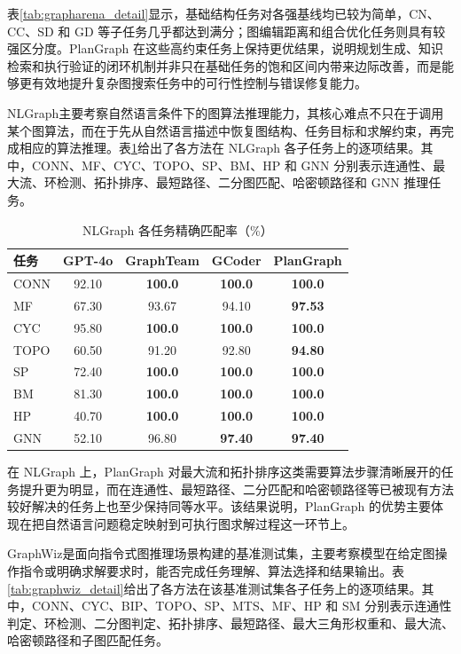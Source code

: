 表\ref{tab:grapharena_detail}显示，基础结构任务对各强基线均已较为简单，CN、CC、SD 和 GD 等子任务几乎都达到满分；图编辑距离和组合优化任务则具有较强区分度。PlanGraph 在这些高约束任务上保持更优结果，说明规划生成、知识检索和执行验证的闭环机制并非只在基础任务的饱和区间内带来边际改善，而是能够更有效地提升复杂图搜索任务中的可行性控制与错误修复能力。

NLGraph\cite{chen2024nlgraph}主要考察自然语言条件下的图算法推理能力，其核心难点不只在于调用某个图算法，而在于先从自然语言描述中恢复图结构、任务目标和求解约束，再完成相应的算法推理。表\ref{tab:nlgraph_detail}给出了各方法在 NLGraph 各子任务上的逐项结果。其中，CONN、MF、CYC、TOPO、SP、BM、HP 和 GNN 分别表示连通性、最大流、环检测、拓扑排序、最短路径、二分图匹配、哈密顿路径和 GNN 推理任务。

\begin{table}[htbp]
\centering
\caption{NLGraph 各任务精确匹配率（\%）}
\label{tab:nlgraph_detail}
\begin{tabular}{lcccc}
\toprule
任务 & GPT-4o & GraphTeam & GCoder & PlanGraph \\
\midrule
CONN & 92.10 & \textbf{100.0} & \textbf{100.0} & \textbf{100.0} \\
MF & 67.30 & 93.67 & 94.10 & \textbf{97.53} \\
CYC & 95.80 & \textbf{100.0} & \textbf{100.0} & \textbf{100.0} \\
TOPO & 60.50 & 91.20 & 92.80 & \textbf{94.80} \\
SP & 72.40 & \textbf{100.0} & \textbf{100.0} & \textbf{100.0} \\
BM & 81.30 & \textbf{100.0} & \textbf{100.0} & \textbf{100.0} \\
HP & 40.70 & \textbf{100.0} & \textbf{100.0} & \textbf{100.0} \\
GNN & 52.10 & 96.80 & \textbf{97.40} & \textbf{97.40} \\
\bottomrule
\end{tabular}
\end{table}

在 NLGraph 上，PlanGraph 对最大流和拓扑排序这类需要算法步骤清晰展开的任务提升更为明显，而在连通性、最短路径、二分匹配和哈密顿路径等已被现有方法较好解决的任务上也至少保持同等水平。该结果说明，PlanGraph 的优势主要体现在把自然语言问题稳定映射到可执行图求解过程这一环节上。

GraphWiz\cite{gong2024graphwiz}是面向指令式图推理场景构建的基准测试集，主要考察模型在给定图操作指令或明确求解要求时，能否完成任务理解、算法选择和结果输出。表\ref{tab:graphwiz_detail}给出了各方法在该基准测试集各子任务上的逐项结果。其中，CONN、CYC、BIP、TOPO、SP、MTS、MF、HP 和 SM 分别表示连通性判定、环检测、二分图判定、拓扑排序、最短路径、最大三角形权重和、最大流、哈密顿路径和子图匹配任务。

